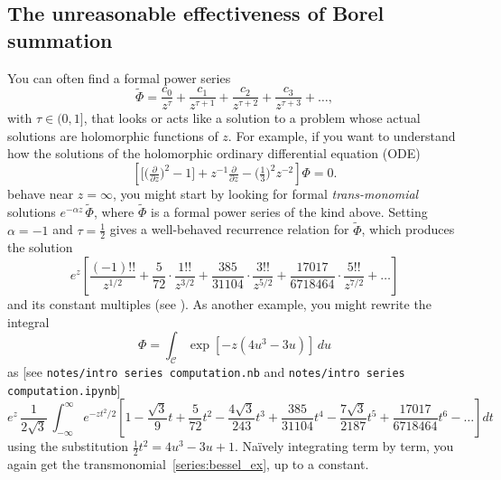 \documentclass{article}
\newcommand{\series}[1]{\tilde{#1}}
\theoremstyle{definition}
\theoremstyle{plain}
\newenvironment{verify}{\color{ForestGreen}}{\color{black}}
\begin{document}
\subsection{The unreasonable effectiveness of Borel summation}\label{intro:summation}
You can often find a formal power series
\[ \series{\Phi} = \frac{c_0}{z^\tau} + \frac{c_1}{z^{\tau+1}} + \frac{c_2}{z^{\tau+2}} + \frac{c_3}{z^{\tau+3}} + \ldots, \]
with $\tau \in (0, 1]$, that looks or acts like a solution to a problem whose actual solutions are holomorphic functions of $z$. For example, if you want to understand how the solutions of the holomorphic ordinary differential equation (ODE)
\begin{equation}
\left[ \big[ \big(\tfrac{\partial}{\partial z}\big)^2 - 1 \big] + z^{-1} \tfrac{\partial}{\partial z} - \big(\tfrac{1}{3}\big)^2 z^{-2} \right] \Phi= 0. \label{eqn:bessel_rescaled_ex}
\end{equation}
behave near $z = \infty$, you might start by looking for formal {\em trans-monomial} solutions $e^{-\alpha z}\,\series{\Phi}$, where $\series{\Phi}$ is a formal power series of the kind above. Setting $\alpha = -1$ and $\tau = \tfrac{1}{2}$ gives a well-behaved recurrence relation for $\series{\Phi}$, which produces the solution 
\begin{equation}
e^{z} \left[ \frac{(-1)!!}{z^{1/2}} + \frac{5}{72} \cdot \frac{1!!}{z^{3/2}} + \frac{385}{31104} \cdot \frac{3!!}{z^{5/2}} + \frac{17017}{6718464} \cdot \frac{5!!}{z^{7/2}} + \ldots \right] \label{series:bessel_ex}
\end{equation}
and its constant multiples (see \cite[equation 10.40.1]{dlmf}). As another example, you might rewrite the integral
\begin{equation}\label{int:bessel_ex}
\Phi = \int_{\mathcal{C}} \exp\left[-z \left(4 u^3 - 3 u\right)\right]\,du
\end{equation}
as \begin{verify}[see \texttt{notes/intro series computation.nb} and \texttt{notes/intro series computation.ipynb}]\end{verify}
\[ e^{z}\, \frac{1}{2\sqrt{3}}\, \int_{-\infty}^\infty e^{-z t^2/2} \left[ 1 - \frac{\sqrt{3}}{9} t + \frac{5}{72} t^2 - \frac{4\sqrt{3}}{243} t^3 + \frac{385}{31104} t^4 - \frac{7\sqrt{3}}{2187} t^5 + \frac{17017}{6718464} t^6 - \ldots \right] dt \]
using the substitution $\tfrac{1}{2} t^2 = 4u^3 - 3u + 1$. Na\"{i}vely integrating term by term, you again get the transmonomial~\eqref{series:bessel_ex}, up to a constant.
\end{document}
